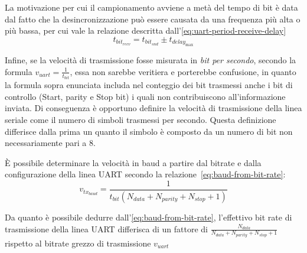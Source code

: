 
La motivazione per cui il campionamento avviene a metà del tempo di bit è data dal fatto che la desincronizzazione può essere causata da una frequenza più alta o più bassa, per cui vale la relazione descritta dall'\cref{eq:uart-period-receive-delay}
\begin{equation}\label{eq:uart-period-receive-delay}
     t_{bit_{recv}} = t_{bit_{snd}} \pm t_{delay_{\max}}
\end{equation}

Infine, se la velocità di trasmissione fosse misurata in \textit{bit per secondo}, secondo la formula \(v_{uart} = \frac{1}{t_{bit}}\), essa non sarebbe veritiera e porterebbe confusione, in quanto la formula sopra enunciata includa nel conteggio dei bit trasmessi anche i bit di controllo (Start, parity e Stop bit) i quali non contribuiscono all'informazione inviata. Di conseguenza è opportuno definire la velocità di trasmissione della linea seriale come il numero di simboli trasmessi per secondo. Questa definizione differisce dalla prima un quanto il simbolo è composto da un numero di bit non necessariamente pari a 8.

È possibile determinare la velocità in baud a partire dal bitrate e dalla configurazione della linea UART secondo la relazione~\ref{eq:baud-from-bit-rate}\cite{site:baud}:
\begin{equation}\label{eq:baud-from-bit-rate}
    v_{tx_{baud}} = \frac{1}{t_{bit}(N_{data} + N_{parity} + N_{stop} + 1)}
\end{equation}

Da quanto è possibile dedurre dall'\cref{eq:baud-from-bit-rate}, l'effettivo bit rate di trasmissione della linea UART differisca di un fattore di \(\frac{N_{data}}{N_{data} + N_{parity} + N_{stop} + 1}\) rispetto al bitrate grezzo di trasmissione \(v_{uart}\)


